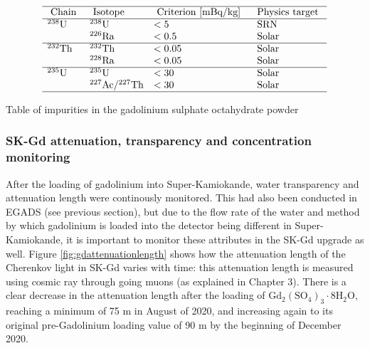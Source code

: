 \begin{table}

    $$
    \begin{array}{llll}
    \hline \text { Chain } & \text { Isotope } & \text { Criterion [mBq/kg] } & \text { Physics target } \\
        \hline{ }^{238} \mathrm{U} & { }^{238} \mathrm{U} & <5 & \text { SRN } \\
    & { }^{226} \mathrm{Ra} & <0.5 & \text { Solar } \\
    \hline{ }^{232} \mathrm{Th} & { }^{232} \mathrm{Th} & <0.05 & \text { Solar } \\
    & { }^{228} \mathrm{Ra} & <0.05 & \text { Solar } \\
    \hline{ }^{235} \mathrm{U} & { }^{235} \mathrm{U} & <30 & \text { Solar } \\
    & { }^{227} \mathrm{Ac} /{ }^{227} \mathrm{Th} & <30 & \text { Solar } \\
    \hline
    \end{array}
    $$
\caption{Table of impurities in the gadolinium sulphate octahydrate powder}
\label{gdpowderradiation}
\end{table}

\subsubsection{SK-Gd attenuation, transparency and concentration monitoring}

After the loading of gadolinium into Super-Kamiokande, water transparency and attenuation length were continously monitored. This had also been conducted in EGADS (see previous section), but due to the flow rate of the water and method by which gadolinium is loaded into the detector being different in Super-Kamiokande, it is important to monitor these attributes in the SK-Gd upgrade as well. Figure \ref{fig:gdattenuationlength} shows how the attenuation length of the Cherenkov light in SK-Gd varies with time: this attenuation length is measured using cosmic ray through going muons (as explained in Chapter 3). There is a clear decrease in the attenuation length after the loading of $\mathrm{Gd}_{2}\left(\mathrm{SO}_{4}\right)_{3} \cdot 8 \mathrm{H}_{2} \mathrm{O}$, reaching a minimum of 75 m in August of 2020, and increasing again to its original pre-Gadolinium loading value of 90 m by the beginning of December 2020.  

